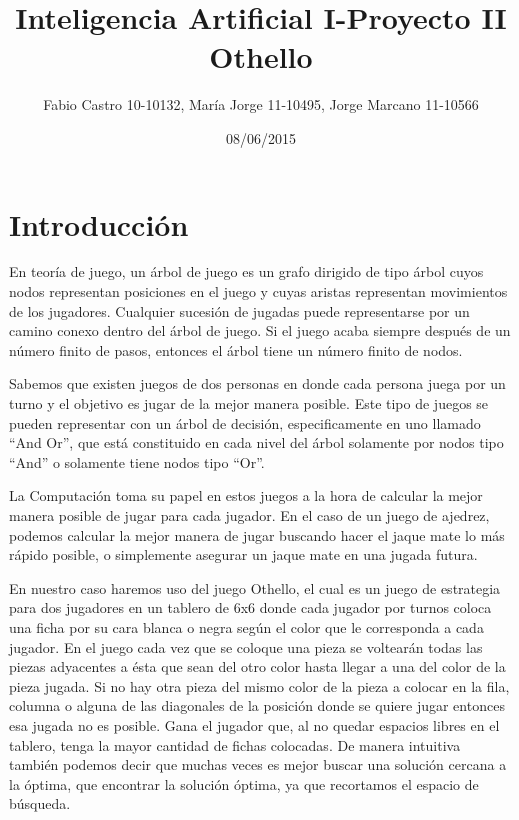 \documentclass{article}
\title{}
\author{}
\date{}
\begin{document}
 
\title{\Huge Inteligencia Artificial I-Proyecto II Othello }



\author{Fabio Castro 10-10132, María Jorge 11-10495, Jorge Marcano 11-10566} 



\date{08/06/2015}

\maketitle

\section{Introducción}
\hspace{0.5cm}En teoría de juego, un árbol de juego es un grafo dirigido de tipo árbol cuyos nodos representan posiciones en el juego y cuyas aristas representan movimientos de los jugadores. Cualquier sucesión de jugadas puede representarse por un camino conexo dentro del árbol de juego. Si el juego acaba siempre después de un número finito de pasos, entonces el árbol tiene un número finito de nodos.

Sabemos que existen juegos de dos personas en donde cada persona juega por un turno y el objetivo es jugar de la mejor manera posible. Este tipo de juegos se pueden representar con un árbol de decisión, especificamente en uno llamado “And Or”, que está
constituido en cada nivel del árbol solamente por nodos tipo “And” o solamente tiene nodos tipo “Or”. 

La Computación toma su papel en estos juegos a la hora de calcular la mejor manera posible de jugar para cada jugador. En el caso de un juego de ajedrez, podemos calcular la mejor manera de jugar buscando hacer el jaque
mate lo más rápido posible, o simplemente asegurar un jaque mate en una jugada futura. 

En nuestro caso haremos uso del juego Othello, el cual es un juego de estrategia para dos jugadores en un tablero de 6x6 donde cada
jugador por turnos coloca una ficha por su cara blanca o negra según el color que le corresponda a cada jugador. En
el juego cada vez que se coloque una pieza se voltearán todas las piezas adyacentes a ésta
que sean del otro color hasta llegar a una del color de la pieza jugada. Si no hay otra pieza
del mismo color de la pieza a colocar en la fila, columna o alguna de las diagonales de la
posición donde se quiere jugar entonces esa jugada no es posible. Gana el jugador que, al
no quedar espacios libres en el tablero, tenga la mayor cantidad de fichas colocadas. 
 De manera intuitiva también podemos decir que muchas veces es mejor buscar una solución cercana a la óptima, que encontrar la solución óptima, ya que recortamos el espacio de búsqueda. 
\end{document}

